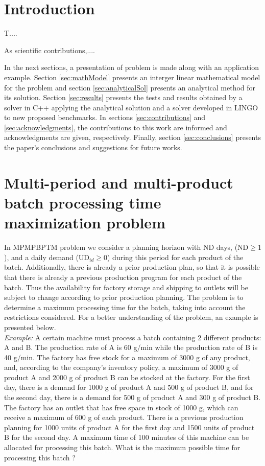 \documentclass[authoryear,preprint,12pt]{elsarticle}
\begin{document}

\section{Introduction}
\label{sec:intro}

T....

As scientific contributions,....

In the next sections, a presentation of problem is made along with an application example. Section \ref{sec:mathModel} presents an interger linear mathematical model for the problem and section \ref{sec:analyticalSol} presents an analytical method for its solution. Section \ref{sec:results} presents the tests and results obtained by a solver in C++ applying the analytical solution and a solver developed in LINGO to new proposed benchmarks. In sections \ref{sec:contributions} and \ref{sec:acknowledgments}, the contributions to this work are informed and acknowledgments are given, respectively. Finally, section \ref{sec:conclusions} presents the paper's conclusions and suggestions for future works.

\section{Multi-period and multi-product batch processing time maximization problem}
\label{sec:MBPTMP}

In MPMPBPTM problem we consider a planning horizon with $\textrm{ND}$ days, ($\textrm{ND} \geq 1$), and a daily demand ($\textrm{UD}_{id} \geq 0$) during this period for each product of the batch. Additionally, there is already a prior production plan, so that it is possible that there is already a previous production program for each product of the batch. Thus the availability for factory storage and shipping to outlets will be subject to change according to prior production planning. The problem is to determine a maximum processing time for the batch, taking into account the restrictions considered. For a better understanding of the problem, an example is presented below. \\

\emph{Example:} A certain machine must process a batch containing 2 different products: A and B. The production rate of A is 60 g/min while the production rate of B is 40 g/min. The factory has free stock for a maximum of 3000 g of any product, and, according to the company's inventory policy, a maximum of 3000 g of product A and 2000 g of product B can be stocked at the factory. For the first day, there is a demand for 1000 g of product A and 500 g of product B, and for the second day, there is a demand for 500 g of product A and 300 g of product B. The factory has an outlet that has free space in stock of 1000 g, which can receive a maximum of 600 g of each product. There is a previous production planning for 1000 units of product A for the first day and 1500 units of product B for the second day. A maximum time of 100 minutes of this machine can be allocated for processing this batch. What is the maximum possible time for processing this batch ?  \\
\end{document}
